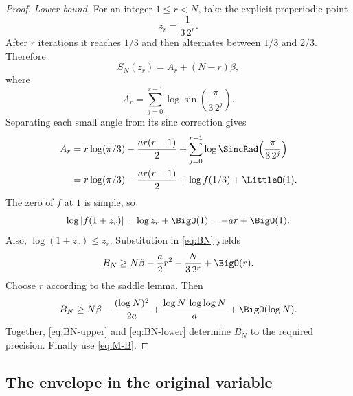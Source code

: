 \documentclass[11pt,oneside]{article}
\theoremstyle{definition}
\theoremstyle{remark}
\begin{document}
\begin{proof}
\emph{Lower bound.}
For an integer $1\le r<N$, take the explicit preperiodic point
\begin{equation}
 z_r=\frac{1}{3\,2^r}.                                      \label{eq:zr}
\end{equation}
After $r$ iterations it reaches $1/3$ and then alternates between $1/3$ and
$2/3$.  Therefore
\begin{equation}
 S_N(z_r)=A_r+(N-r)\beta,                                   \label{eq:SN-zr}
\end{equation}
where
\begin{equation}
 A_r=\sum_{j=0}^{r-1}\log\sin\!\left(\frac{\pi}{3\,2^j}\right).
\end{equation}
Separating each small angle from its sinc correction gives
\begin{align}
 A_r
 & =r\log(\pi/3)-\frac{ar(r-1)}2
 +\sum_{j=0}^{r-1}\log\SincRad\!\left(\frac{\pi}{3\,2^j}\right)\notag\\
 & =r\log(\pi/3)-\frac{ar(r-1)}2+\log f(1/3)+\LittleO(1).   \label{eq:Ar-asymp}
\end{align}
The zero of $f$ at $1$ is simple, so
\begin{equation}
 \log|f(1+z_r)|=\log z_r+\BigO(1)=-ar+\BigO(1).             \label{eq:f-near-one}
\end{equation}
Also, $\log(1+z_r)\le z_r$.  Substitution in \eqref{eq:BN} yields
\begin{equation}
 B_N\ge N\beta-\frac a2r^2-\frac{N}{3\,2^r}+\BigO(r).     \label{eq:BN-lower-r}
\end{equation}
Choose $r$ according to the saddle lemma.  Then
\begin{equation}
 B_N\ge N\beta-
\frac{(\log N)^2}{2a}
 +\frac{\log N\,\log\log N}{a}+\BigO(\log N).             \label{eq:BN-lower}
\end{equation}
Together, \eqref{eq:BN-upper} and \eqref{eq:BN-lower} determine $B_N$ to the
required precision.  Finally use \eqref{eq:M-B}.
\end{proof}

\subsection{The envelope in the original variable}
\end{document}
